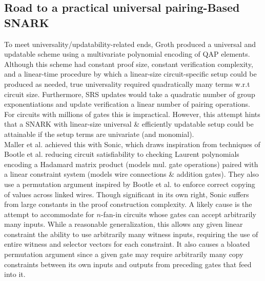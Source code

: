 \subsection{Road to a practical universal pairing-Based SNARK}
\noindent To meet universality/updatability-related ends, Groth \cite{grothupdatable} produced a universal and updatable scheme using a multivariate polynomial encoding of QAP elements. Although this scheme had constant proof size, constant verification complexity, and a linear-time procedure by which a linear-size circuit-specific setup could be produced as needed, true universality required quadratically many terms w.r.t circuit size. Furthermore, SRS updates would take a quadratic number of group exponentiations and update verification a linear number of pairing operations. For circuits with millions of gates this is impractical. However, this attempt hints that a SNARK with linear-size universal \& efficiently updatable setup could be attainable if the setup terms are univariate (and monomial).\\ 

\noindent Maller et al. achieved this with Sonic, which draws inspiration from techniques of Bootle et al. \cite{bootlezkargs} reducing circuit satisfiability to checking Laurent polynomials encoding a Hadamard matrix product (models mul. gate operations) paired with a linear constraint system (models wire connections \& addition gates). They also use a permutation argument inspired by Bootle et al. \cite{grothshuffle} to enforce correct copying of values across linked wires. Though significant in its own right, Sonic suffers from large constants in the proof construction complexity. A likely cause is the attempt to accommodate for $n$-fan-in circuits whose gates can accept arbitrarily many inputs. While a reasonable generalization, this allows any given linear constraint the ability to use arbitrarily many witness inputs, requiring the use of entire witness and selector vectors for each constraint. It also causes a bloated permutation argument since a given gate may require arbitrarily many copy constraints between its own inputs and outputs from preceding gates that feed into it. \\ 

